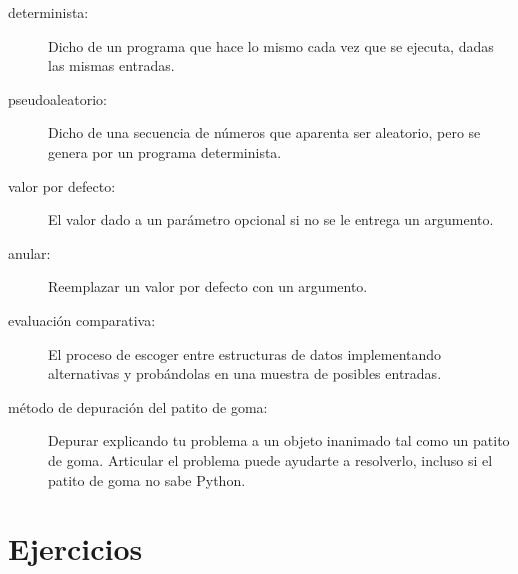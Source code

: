 \documentclass[10pt]{book}
\begin{document}
\begin{description}

\item[determinista:] Dicho de un programa que hace lo
mismo cada vez que se ejecuta, dadas las mismas entradas.

\item[pseudoaleatorio:] Dicho de una secuencia de números que aparenta
ser aleatorio, pero se genera por un programa determinista.

\item[valor por defecto:] El valor dado a un parámetro opcional si
no se le entrega un argumento.


\item[anular:] Reemplazar un valor por defecto con un argumento.

\item[evaluación comparativa:] El proceso de escoger entre estructuras de datos
implementando alternativas y probándolas en una muestra de
posibles entradas.

\item[método de depuración del patito de goma:] Depurar explicando tu problema
a un objeto inanimado tal como un patito de goma.  Articular el
problema puede ayudarte a resolverlo, incluso si el patito de goma no sabe
Python.

\end{description}


\section{Ejercicios}
\end{document}
